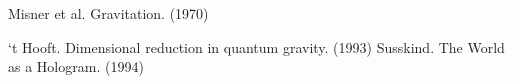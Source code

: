 \documentclass[12pt]{article}
\begin{document}







\begin{thebibliography}{9}

 Misner et al. Gravitation. (1970)

 `t Hooft. Dimensional reduction in quantum gravity. (1993)
 Susskind. The World as a Hologram. (1994)








\end{thebibliography}
\end{document}
